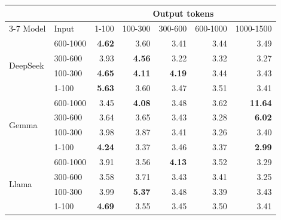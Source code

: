 \begin{tabular}{llrrrrr}
\toprule
 & & \multicolumn{5}{c}{Output tokens} \\
\cmidrule(lr){3-7}
Model & Input & 1-100 & 100-300 & 300-600 & 600-1000 & 1000-1500 \\
\midrule
\multirow{4}{*}{DeepSeek} & 600-1000 & \textbf{4.62} & 3.60 & 3.41 & 3.44 & 3.49 \\
 & 300-600 & 3.93 & \textbf{4.56} & 3.22 & 3.32 & 3.27 \\
 & 100-300 & \textbf{4.65} & \textbf{4.11} & \textbf{4.19} & 3.44 & 3.43 \\
 & 1-100 & \textbf{5.63} & 3.60 & 3.47 & 3.51 & 3.41 \\
\midrule
\multirow{4}{*}{Gemma} & 600-1000 & 3.45 & \textbf{4.08} & 3.48 & 3.62 & \textbf{11.64} \\
 & 300-600 & 3.64 & 3.65 & 3.43 & 3.28 & \textbf{6.02} \\
 & 100-300 & 3.98 & 3.87 & 3.41 & 3.26 & 3.40 \\
 & 1-100 & \textbf{4.24} & 3.37 & 3.46 & 3.37 & \textbf{2.99} \\
\midrule
\multirow{4}{*}{Llama} & 600-1000 & 3.91 & 3.56 & \textbf{4.13} & 3.52 & 3.29 \\
 & 300-600 & 3.58 & 3.71 & 3.43 & 3.41 & 3.25 \\
 & 100-300 & 3.99 & \textbf{5.37} & 3.48 & 3.39 & 3.43 \\
 & 1-100 & \textbf{4.69} & 3.55 & 3.45 & 3.50 & 3.41 \\
\bottomrule
\end{tabular}
